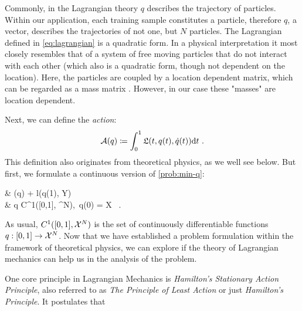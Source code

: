 Commonly, in the Lagrangian theory $q$ describes the trajectory of particles.
Within our application, each training sample constitutes a particle, therefore $q$, a vector, describes the trajectories of not one, but $N$ particles.
The Lagrangian defined in \cref{eq:lagrangian} is a quadratic form.
In a physical interpretation it most closely resembles that of a system of free moving particles that do not interact with each other (which also is a quadratic form, though not dependent on the location).
Here, the particles are coupled by a location dependent matrix, which can be regarded as a mass matrix \cite{marsden10}.
However, in our case these "masses" are location dependent.


Next, we can define the \emph{action}:
\begin{equation}
\label{eq:action}
	\cA(q) \coloneqq \int_{0}^{1} \fL(t, q(t), \dot{q}(t)) \mathrm{d}t \ .
\end{equation}
This definition also originates from theoretical physics, as we well see below.
But first, we formulate a continuous version of \cref{prob:min-q}:
\begin{problem}
\label{prob:cont-least-action}
	\begin{cases}
		 & \nu \cA(q) + l(q(1), Y)\\
		 & q \in C^1([0,1], \cX^N),\ q(0) = X \ .
	\end{cases}
\end{problem}
As usual, $C^1([0,1], \mathcal{X}^N)$ is the set of continuously differentiable functions $q: [0, 1] \rightarrow \mathcal{X}^N$.
Now that we have established a problem formulation within the framework of theoretical physics, we can explore if the theory of Lagrangian mechanics can help us in the analysis of the problem.

One core principle in Lagrangian Mechanics is \emph{Hamilton's Stationary Action Principle}, also referred to as \emph{The Principle of Least Action} or just \emph{Hamilton's Principle}.
It postulates that\vspace{.5em}
\newline
{}

